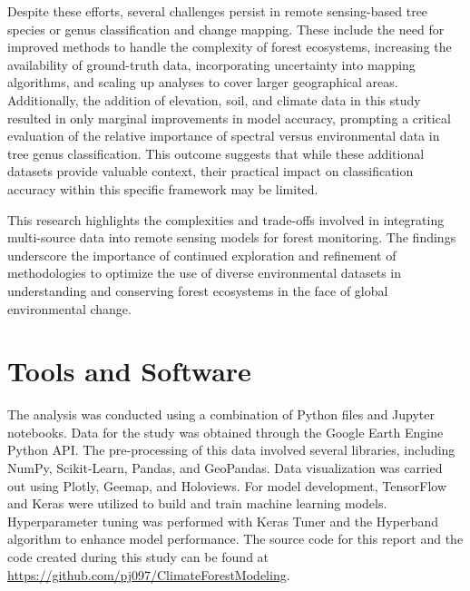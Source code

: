 Despite these efforts, several challenges persist in remote sensing-based tree species or genus classification and change mapping. These include the need for improved methods to handle the complexity of forest ecosystems, increasing the availability of ground-truth data, incorporating uncertainty into mapping algorithms, and scaling up analyses to cover larger geographical areas. Additionally, the addition of elevation, soil, and climate data in this study resulted in only marginal improvements in model accuracy, prompting a critical evaluation of the relative importance of spectral versus environmental data in tree genus classification. This outcome suggests that while these additional datasets provide valuable context, their practical impact on classification accuracy within this specific framework may be limited.

This research highlights the complexities and trade-offs involved in integrating multi-source data into remote sensing models for forest monitoring. The findings underscore the importance of continued exploration and refinement of methodologies to optimize the use of diverse environmental datasets in understanding and conserving forest ecosystems in the face of global environmental change.

\section{Tools and Software}

The analysis was conducted using a combination of Python files and Jupyter notebooks. Data for the study was obtained through the Google Earth Engine Python API. The pre-processing of this data involved several libraries, including NumPy, Scikit-Learn, Pandas, and GeoPandas. Data visualization was carried out using Plotly, Geemap, and Holoviews. For model development, TensorFlow and Keras were utilized to build and train machine learning models. Hyperparameter tuning was performed with Keras Tuner and the Hyperband algorithm to enhance model performance. The source code for this report and the code created during this study can be found at \url{https://github.com/pj097/ClimateForestModeling}.